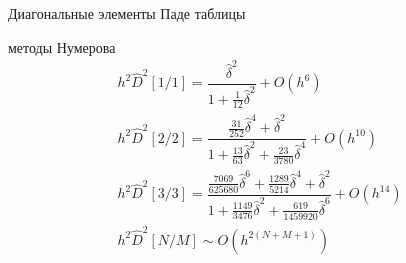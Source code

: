 \documentclass[10pt,pdf,hyperref={unicode},xcolor=dvipsnames]{beamer}
\newcommand{\hD}{\hat{D}}
\begin{document}
\begin{frame}{Диагональные элементы Паде таблицы }
    \begin{block}{ методы Нумерова}
        \begin{gather}
            h^2 \hD^2 [1/1] = \dfrac{\hat{\delta}^2}{1 + \frac{1}{12} \hat{\delta}^2} + O(h^6) \\
            h^2 \hD^2 [2/2] = \dfrac{\frac{31}{252} \hat{\delta}^4 + \hat{\delta}^2}{1 + \frac{13}{63} \hat{\delta}^2 + \frac{23}{3780} \hat{\delta}^4} + O(h^{10}) \\
            h^2 \hD^2 [3/3] = \dfrac{\frac{7069}{625680} \hat{\delta}^6 + \frac{1289}{5214} \hat{\delta}^4 + \hat{\delta}^2}{1 + \frac{1149}{3476} \hat{\delta}^2 + \frac{619}{1459920} \hat{\delta}^6} + O(h^{14}) \\
            h^2 \hD^2 [N/M] \sim O(h^{2(N+M+1)})
        \end{gather}
    \end{block}
\end{frame}
\end{document}
